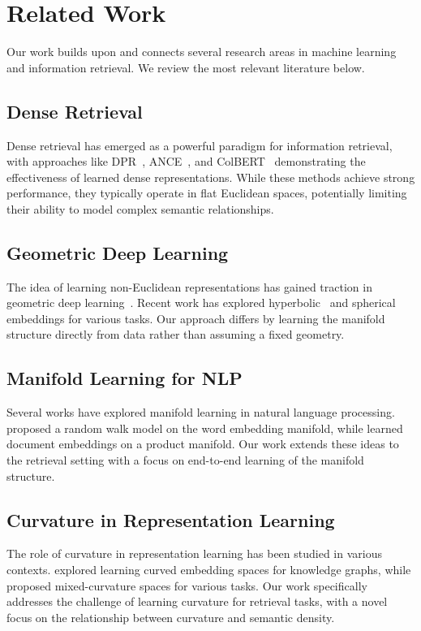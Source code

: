 \section{Related Work}
\label{sec:related}

Our work builds upon and connects several research areas in machine learning and information retrieval. We review the most relevant literature below.

\subsection{Dense Retrieval}
Dense retrieval has emerged as a powerful paradigm for information retrieval, with approaches like DPR~\cite{karpukhin2020dense}, ANCE~\cite{xiong2021approximate}, and ColBERT~\cite{khattab2020colbert} demonstrating the effectiveness of learned dense representations. While these methods achieve strong performance, they typically operate in flat Euclidean spaces, potentially limiting their ability to model complex semantic relationships.

\subsection{Geometric Deep Learning}
The idea of learning non-Euclidean representations has gained traction in geometric deep learning~\cite{bronstein2021geometric}. Recent work has explored hyperbolic~\cite{nickel2017poincare} and spherical~\cite{liu2019spherical} embeddings for various tasks. Our approach differs by learning the manifold structure directly from data rather than assuming a fixed geometry.

\subsection{Manifold Learning for NLP}
Several works have explored manifold learning in natural language processing. \citet{arora2018linear} proposed a random walk model on the word embedding manifold, while \citet{wang2020learning} learned document embeddings on a product manifold. Our work extends these ideas to the retrieval setting with a focus on end-to-end learning of the manifold structure.

\subsection{Curvature in Representation Learning}
The role of curvature in representation learning has been studied in various contexts. \citet{gu2018learning} explored learning curved embedding spaces for knowledge graphs, while \citet{skopek2020mixed} proposed mixed-curvature spaces for various tasks. Our work specifically addresses the challenge of learning curvature for retrieval tasks, with a novel focus on the relationship between curvature and semantic density.

